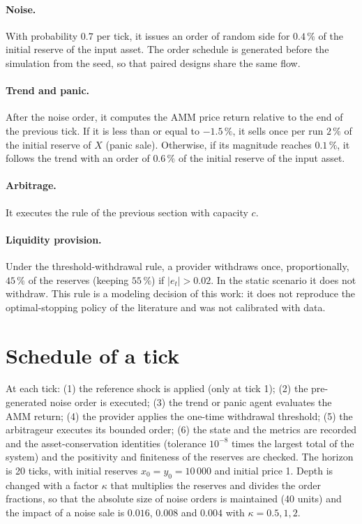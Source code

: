 \paragraph{Noise.} With probability $0.7$ per tick, it issues an order of random side for $0.4\,\%$ of the initial reserve of the input asset. The order schedule is generated before the simulation from the seed, so that paired designs share the same flow.

\paragraph{Trend and panic.} After the noise order, it computes the AMM price return relative to the end of the previous tick. If it is less than or equal to $-1.5\,\%$, it sells once per run $2\,\%$ of the initial reserve of $X$ (panic sale). Otherwise, if its magnitude reaches $0.1\,\%$, it follows the trend with an order of $0.6\,\%$ of the initial reserve of the input asset.

\paragraph{Arbitrage.} It executes the rule of the previous section with capacity $c$.

\paragraph{Liquidity provision.} Under the threshold-withdrawal rule, a provider withdraws once, proportionally, $45\,\%$ of the reserves (keeping $55\,\%$) if $|e_t|>0.02$. In the static scenario it does not withdraw. This rule is a modeling decision of this work: it does not reproduce the optimal-stopping policy of the literature \cite{bergault2025exit} and was not calibrated with data.

\section{Schedule of a tick}

At each tick: (1) the reference shock is applied (only at tick 1); (2) the pre-generated noise order is executed; (3) the trend or panic agent evaluates the AMM return; (4) the provider applies the one-time withdrawal threshold; (5) the arbitrageur executes its bounded order; (6) the state and the metrics are recorded and the asset-conservation identities (tolerance $10^{-8}$ times the largest total of the system) and the positivity and finiteness of the reserves are checked. The horizon is 20 ticks, with initial reserves $x_0=y_0=10\,000$ and initial price 1. Depth is changed with a factor $\kappa$ that multiplies the reserves and divides the order fractions, so that the absolute size of noise orders is maintained (40 units) and the impact of a noise sale is $0.016$, $0.008$ and $0.004$ with $\kappa=0.5,1,2$.


